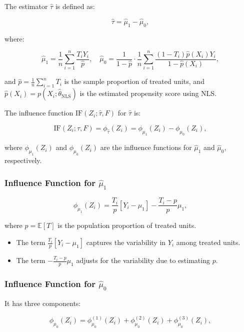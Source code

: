 \documentclass{article}
\begin{document}
The estimator \(\hat{\tau}\) is defined as:

\[
\hat{\tau} = \hat{\mu}_1 - \hat{\mu}_0,
\]

where:

\[
\hat{\mu}_1 = \frac{1}{n} \sum_{i=1}^n \frac{T_i Y_i}{\hat{p}},
\quad
\hat{\mu}_0 = \frac{1}{1 - \hat{p}} \cdot \frac{1}{n} \sum_{i=1}^n \frac{(1 - T_i) \hat{p}(X_i) Y_i}{1 - \hat{p}(X_i)},
\]

and \(\hat{p} = \frac{1}{n} \sum_{i=1}^n T_i\) is the sample proportion of treated units, and \(\hat{p}(X_i) = p(X_i; \hat{\theta}_{\text{NLS}})\) is the estimated propensity score using NLS.

The influence function \(\text{IF}(Z_i; \hat{\tau}, F)\) for \(\hat{\tau}\) is:

\[
\text{IF}(Z_i; \hat{\tau}, F) = \phi_{\hat{\tau}}(Z_i) = \phi_{\mu_1}(Z_i) - \phi_{\mu_0}(Z_i),
\]

where \(\phi_{\mu_1}(Z_i)\) and \(\phi_{\mu_0}(Z_i)\) are the influence functions for \(\hat{\mu}_1\) and \(\hat{\mu}_0\), respectively.

\subsubsection*{Influence Function for \( \hat{\mu}_1 \)}

\[
\phi_{\mu_1}(Z_i) = \frac{T_i}{p} [Y_i - \mu_1] - \frac{T_i - p}{p} \mu_1,
\]

where \(p = \mathbb{E}[T]\) is the population proportion of treated units.

\begin{itemize}
    \item The term \(\frac{T_i}{p} [Y_i - \mu_1]\) captures the variability in \(Y_i\) among treated units.
    \item The term \(-\frac{T_i - p}{p} \mu_1\) adjusts for the variability due to estimating \(p\).
\end{itemize}

\subsubsection*{Influence Function for \( \hat{\mu}_0 \)}

It has three components:

\[
\phi_{\mu_0}(Z_i) = \phi_{\mu_0}^{(1)}(Z_i) + \phi_{\mu_0}^{(2)}(Z_i) + \phi_{\mu_0}^{(3)}(Z_i),
\]
\end{document}
